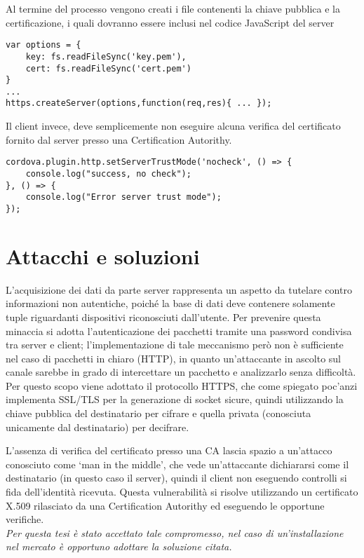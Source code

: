 \documentclass[target=bach]{thud}
\begin{document}
    Al termine del processo vengono creati i file contenenti la chiave pubblica e la certificazione, i quali dovranno essere inclusi nel codice JavaScript del server
\begin{lstlisting}
var options = {
    key: fs.readFileSync('key.pem'),
    cert: fs.readFileSync('cert.pem')
}
...
https.createServer(options,function(req,res){ ... });
\end{lstlisting}

    Il client invece, deve semplicemente non eseguire alcuna verifica del certificato fornito dal server presso una Certification Autorithy.
\begin{lstlisting}
cordova.plugin.http.setServerTrustMode('nocheck', () => {
    console.log("success, no check");
}, () => {
    console.log("Error server trust mode");
});
\end{lstlisting}


\section{Attacchi e soluzioni}
    L'acquisizione dei dati da parte server rappresenta un aspetto da tutelare contro informazioni non autentiche, poiché la base di dati deve contenere solamente tuple riguardanti dispositivi riconosciuti dall'utente.
    Per prevenire questa minaccia si adotta l'autenticazione dei pacchetti tramite una password condivisa tra server e client; l'implementazione di tale meccanismo però non è sufficiente nel caso di pacchetti in chiaro (HTTP), in quanto un'attaccante in ascolto sul canale sarebbe in grado di intercettare un pacchetto e analizzarlo senza difficoltà. Per questo scopo viene adottato il protocollo HTTPS, che come spiegato poc'anzi implementa SSL/TLS per la generazione di socket sicure, quindi utilizzando la chiave pubblica del destinatario per cifrare e quella privata (conosciuta unicamente dal destinatario) per decifrare.

    L'assenza di verifica del certificato presso una CA lascia spazio a un'attacco conosciuto come `man in the middle', che vede un'attaccante dichiararsi come il destinatario (in questo caso il server), quindi il client non eseguendo controlli si fida dell'identità ricevuta. Questa vulnerabilità si risolve utilizzando un certificato X.509 rilasciato da una Certification Autorithy ed eseguendo le opportune verifiche.\\
    \textit{ Per questa tesi è stato accettato tale compromesso, nel caso di un'installazione nel mercato è opportuno adottare la soluzione citata.}
\end{document}
